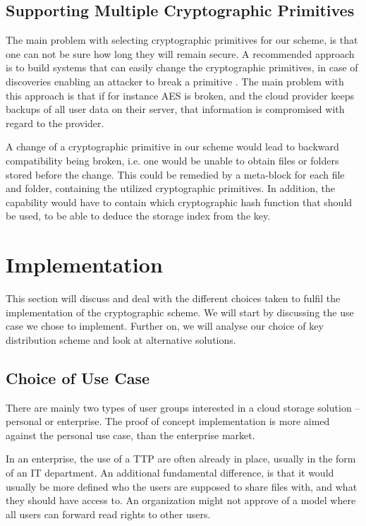 \documentclass[pdftex,english,10pt,b5paper,twoside]{book}
\begin{document}
\subsection{Supporting Multiple Cryptographic Primitives} 

The main problem with selecting cryptographic primitives for our scheme, is
that one can not be sure how long they will remain secure. A recommended
approach is to build systems that can easily change the cryptographic
primitives, in case of discoveries enabling an attacker to break a primitive
\cite{schneier}. The main problem with this approach is that if for instance
\ac{AES} is broken, and the cloud provider keeps backups of all user data on
their server, that information is compromised with regard to the provider.

A change of a cryptographic primitive in our scheme would lead to backward
compatibility being broken, i.e. one would be unable to obtain files or folders
stored before the change. This could be remedied by a meta-block for each file
and folder, containing the utilized cryptographic primitives. In addition, the
capability would have to contain which cryptographic hash function that should
be used, to be able to deduce the storage index from the key.

\section{Implementation}
\label{sec:DIS:impl}

This section will discuss and deal with the different choices taken to fulfil
the implementation of the cryptographic scheme. We will start by discussing the
use case we chose to implement. Further on, we will analyse our choice of key
distribution scheme and look at alternative solutions. 

\subsection{Choice of Use Case}

There are mainly two types of user groups interested in a cloud storage
solution -- personal or enterprise. The proof of concept implementation is more
aimed against the personal use case, than the enterprise market. 

In an enterprise, the use of a \ac{TTP} are often already in place, usually in
the form of an IT department. An additional fundamental difference, is that it
would usually be more defined who the users are supposed to share files with,
and what they should have access to. An organization might not approve of a
model where all users can forward read rights to other users.
\end{document}
